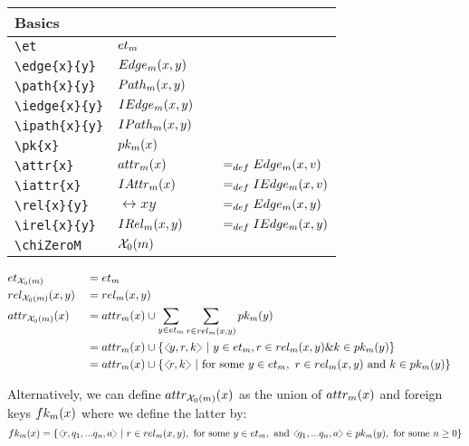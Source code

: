 \documentclass[10pt,a4paper]{article}
\begin{document}
\begin{tabular}{l l p{0.5cm} l }
Basics \\
\hline
\verb'\et'          & $\et$ \\
\verb'\edge{x}{y}'  & $\edge{x}{y}$ \\
\verb'\path{x}{y}'  & $\path{x}{y}$ \\
\verb'\iedge{x}{y}' & $\iedge{x}{y}$ \\
\verb'\ipath{x}{y}' & $\ipath{x}{y}$ \\
\verb'\pk{x}'       & $\pk{x} $      \\
\verb'\attr{x}'     & $\attr{x} $  &       & $=_{def} \edge{x}{\veee}$ \\
\verb'\iattr{x}'    & $\iattr{x} $ &       & $=_{def} \iedge{x}{\veee}$ \\
\verb'\rel{x}{y}'   & $\rel{x}{y}$  &      & $=_{def} \edge{x}{y}$ \\
\verb'\irel{x}{y}'  & $\irel{x}{y}$ &      & $=_{def} \iedge{x}{y}$ \\
\verb'\chiZeroM'    & $\chiZeroM  $ &      &                        \\
\end{tabular}

\newcommand{\set}[1]{\left\{#1\right\}}
\newcommand{\setsuchthat}[2]{\left\{#1 \ \middle|\ #2\right\}}


\begin{align}
&\et[\chiZeroM]        && = \et        && \\
&\rel[\chiZeroM]{x}{y} && = \rel{x}{y}  &&\\
&\attr[\chiZeroM]{x}   && = \attr{x}  \cup  \sum_{y \in \et} \sum_{r \in \rel{x}{y}} \pk{y} && \\
& && = \attr{x}  \cup  \setsuchthat{\tuple{y,r,k}}{y \in \et, r \in \rel{x}{y} \& k \in \pk{y}} \\
& && = \attr{x}  \cup  \setsuchthat{\tuple{r,k}}{\text{for some }
			                  y \in \et, \ r \in \rel{x}{y} \text{ and } k \in \pk{y}} 
\end{align}

Alternatively, we can define $\attr[\chiZeroM]{x}$ as the union of $\attr{x}$ and foreign keys $\fk{x}$
where we define the latter by:
\begin{equation}
\fk{x} = \setsuchthat{\tuple{r,q_1,...q_n,a}}
                               {r \in \rel{x}{y},
                                  \text{ for some } y \in \et,
																	\text{ and } \tuple{q_1,...q_n,a} \in \pk{y},
																	\text{ for some } n \geq 0
			                   }
\end{equation}
\end{document}
